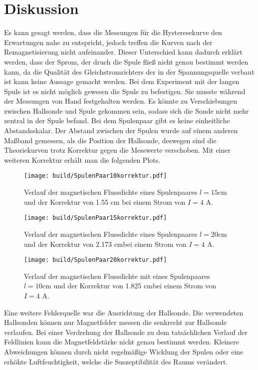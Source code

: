 \section{Diskussion}
\label{sec:Diskussion}Es kann gesagt werden, dass die Messungen für die Hysteresekurve den Erwartungen nahe zu entspricht, jedoch treffen die Kurven nach der Remagnetisierung nicht aufeinander. Dieser Unterschied kann dadurch erklärt werden, dass der Sprom, der druch die Spule fließ nicht genau bestimmt werden kann, da die Qualität des Gleichstromrichters der in der Spannungsquelle verbaut ist kann keine Aussage gemacht werden.
Bei dem Experiment mit der langen Spule ist es nicht möglich gewesen die Spule zu befestigen. Sie musste während der Messungen von Hand festgehalten werden. Es könnte zu Verschiebungen zwischen Hallsonde und Spule gekommen sein, sodass sich die Sonde nicht mehr zentral in der Spule befand.
Bei dem Spulenpaar gibt es keine einheitliche Abstandsskalar. Der Abstand zwischen der Spulen wurde auf einem anderen Maßband gemessen, als die Position der Hallsonde, deswegen sind die Theoriekurven trotz Korrektur gegen die Messwerte verschoben. Mit einer weiteren Korrektur erhält man die folgenden Plots.

\begin{figure}[H]
    \centering
    \texttt{[image: build/SpulenPaar10korrektur.pdf]}
    \caption{Verlauf der magnetischen Flussdichte eines Spulenpaares $l = 15 \unit{\centi\meter}$ und der Korrektur von 1.55 $ \unit{\centi\meter}$  bei einem Strom von $I= 4 \, \, \unit{\ampere}$.}
    \label{fig:SpulenPaar10korrektur}
  \end{figure}

  \begin{figure}[H]
    \centering
    \texttt{[image: build/SpulenPaar15korrektur.pdf]}
    \caption{Verlauf der magnetischen Flussdichte eines Spulenpaares $l = 20 \unit{\centi\meter}$ und der Korrektur von 2.173 $ \unit{\centi\meter}$bei einem Strom von $I= 4 \, \, \unit{\ampere}$.}
    \label{fig:SpulenPaar15korrektur}
  \end{figure}

  \begin{figure}[H]
    \centering
    \texttt{[image: build/SpulenPaar20korrektur.pdf]}
    \caption{Verlauf der magnetischen Flussdichte mit eines Spulenpaares $l = 10 \unit{\centi\meter}$ und der Korrektur von 1.825 $ \unit{\centi\meter}$bei einem Strom von $I= 4 \, \, \unit{\ampere}$.}
    \label{fig:SpulenPaar20korrektur}
  \end{figure}

  Eine weitere Fehlerquelle war die Ausrichtung der Hallsonde. Die verwendeten Hallsonden können nur Magnetfelder messen die senkrecht zur Hallsonde verlaufen. Bei einer Verdrehung der Hallsonde zu dem tatsächlichen Verlauf der Feldlinien kann die Magnetfeldstärke nicht genau bestimmt werden. Kleinere Abweichungen können durch nicht regelmäßige Wicklung der Spulen oder eine erhöhte Luftfeuchtigkeit, welche die Suszeptibilität des Raums verändert.